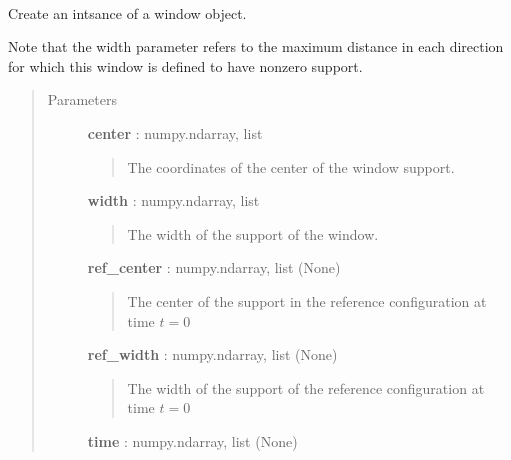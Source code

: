 \documentclass[letterpaper,10pt,english]{sphinxmanual}
\begin{document}
\begin{fulllineitems}
\label{neus/neus.doc:neus.window.Window}~

\begin{fulllineitems}
\label{neus/neus.doc:neus.window.Window.__init__}
Create an intsance of a window object.

Note that the width parameter refers to the maximum distance in each direction for which this window is defined to have nonzero support.
\begin{quote}\begin{description}
\item[{Parameters}] \leavevmode
\textbf{center} : numpy.ndarray, list
\begin{quote}

The coordinates of the center of the window support.
\end{quote}

\textbf{width} : numpy.ndarray, list
\begin{quote}

The width of the support of the window.
\end{quote}

\textbf{ref\_center} : numpy.ndarray, list (None)
\begin{quote}

The center of the support in the reference configuration at time \(t=0\)
\end{quote}

\textbf{ref\_width} : numpy.ndarray, list (None)
\begin{quote}

The width of the support of the reference configuration at time \(t=0\)
\end{quote}

\textbf{time} : numpy.ndarray, list (None)
\begin{quote}


\end{quote}
\end{description}
\end{quote}
\end{fulllineitems}
\end{fulllineitems}
\end{document}

